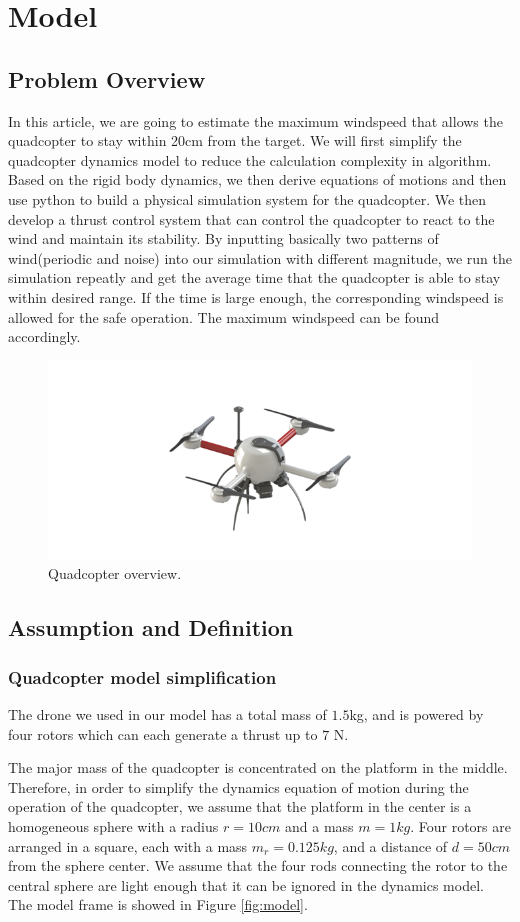 \section{Model}
\subsection{Problem Overview} In this article, we are going to estimate the maximum windspeed that allows the quadcopter to stay within 20cm from the target. We will first simplify the quadcopter dynamics model to reduce the calculation complexity in algorithm. Based on the rigid body dynamics, we then derive equations of motions and then use python to build a physical simulation system for the quadcopter. We then develop a thrust control system that can control the quadcopter to react to the wind and maintain its stability. By inputting basically two patterns of wind(periodic and noise) into our simulation with different magnitude, we run the simulation repeatly and get the average time that the quadcopter is able to stay within desired range. If the time is large enough, the corresponding windspeed is allowed for the safe operation. The maximum windspeed can be found accordingly.

\begin{figure}[htbp]
\centering
\includegraphics[width= 0.7\linewidth, angle =0]{Images/quadcopter.png}
\caption{Quadcopter overview.}
\label{fig:1}
\end{figure}

\subsection{Assumption and Definition}
\subsubsection{Quadcopter model simplification}
The drone we used in our model has a total mass of $1.5 $kg, and is powered by four rotors which can each generate a thrust up to $7$ N.

The major mass of the quadcopter is concentrated on the platform in the middle. Therefore, in order to simplify the dynamics equation of motion during the operation of the quadcopter, we assume that the platform in the center is a homogeneous sphere with a radius $r=10cm$ and a mass $m=1kg$. Four rotors are arranged in a square, each with a mass $m_{r}=0.125kg$, and a distance of $d = 50cm$ from the sphere center. We assume that the four rods connecting the rotor to the central sphere are light enough that it can be ignored in the dynamics model. The model frame is showed in Figure \ref{fig:model}.

